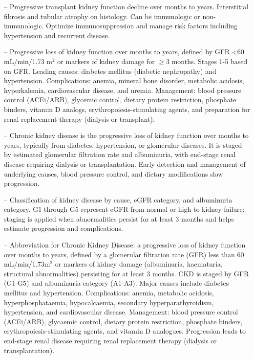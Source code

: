 -- Progressive transplant kidney function decline over months to years. Interstitial fibrosis and tubular atrophy on histology. Can be immunologic or non-immunologic. Optimize immunosuppression and manage risk factors including hypertension and recurrent disease.

-- Progressive loss of kidney function over months to years, defined by GFR <60 mL/min/1.73 m$^2$ or markers of kidney damage for \(\ge\)3 months. Stages 1-5 based on GFR. Leading causes: diabetes mellitus (diabetic nephropathy) and hypertension. Complications: anemia, mineral bone disorder, metabolic acidosis, hyperkalemia, cardiovascular disease, and uremia. Management: blood pressure control (ACEi/ARB), glycemic control, dietary protein restriction, phosphate binders, vitamin D analogs, erythropoiesis-stimulating agents, and preparation for renal replacement therapy (dialysis or transplant).

-- Chronic kidney disease is the progressive loss of kidney function over months to years, typically from diabetes, hypertension, or glomerular diseases. It is staged by estimated glomerular filtration rate and albuminuria, with end-stage renal disease requiring dialysis or transplantation. Early detection and management of underlying causes, blood pressure control, and dietary modifications slow progression.

-- Classification of kidney disease by cause, eGFR category, and albuminuria category. G1 through G5 represent eGFR from normal or high to kidney failure; staging is applied when abnormalities persist for at least 3 months and helps estimate progression and complications.

-- Abbreviation for Chronic Kidney Disease: a progressive loss of kidney function over months to years, defined by a glomerular filtration rate (GFR) less than 60 mL/min/1.73m$^2$ or markers of kidney damage (albuminuria, haematuria, structural abnormalities) persisting for at least 3 months. CKD is staged by GFR (G1-G5) and albuminuria category (A1-A3). Major causes include diabetes mellitus and hypertension. Complications: anemia, metabolic acidosis, hyperphosphataemia, hypocalcaemia, secondary hyperparathyroidism, hypertension, and cardiovascular disease. Management: blood pressure control (ACEi/ARB), glycaemic control, dietary protein restriction, phosphate binders, erythropoiesis-stimulating agents, and vitamin D analogues. Progression leads to end-stage renal disease requiring renal replacement therapy (dialysis or transplantation).

